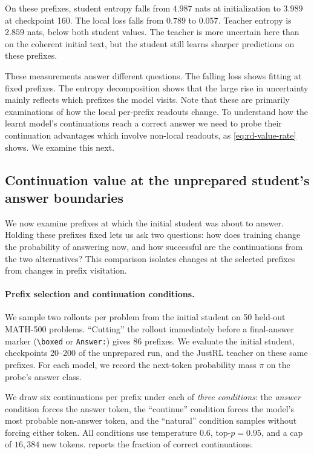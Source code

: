 On these prefixes, student entropy falls from $4.987$ nats at initialization to $3.989$ at checkpoint 160. The local loss falls from $0.789$ to $0.057$. Teacher entropy is $2.859$ nats, below both student values. The teacher is more uncertain here than on the coherent initial text, but the student still learns sharper predictions on these prefixes.

These measurements answer different questions. The falling loss shows fitting at fixed prefixes. The entropy decomposition shows that the large rise in uncertainty mainly reflects which prefixes the model visits. Note that these are primarily examinations of how the local per-prefix readouts change. To understand how the learnt model's continuations reach a correct answer we need to probe their continuation advantages which involve non-local readouts, as \cref{eq:rd-value-rate} shows. We examine this next.

\FloatBarrier
{}
\subsection{Continuation value at the unprepared student's answer boundaries}
\label{app:steer-probe}
We now examine prefixes at which the initial student was about to answer. Holding these prefixes fixed lets us ask two questions: how does training change the probability of answering now, and how successful are the continuations from the two alternatives? This comparison isolates changes at the selected prefixes from changes in prefix visitation.

\paragraph{Prefix selection and continuation conditions.}
We sample two rollouts per problem from the initial student on 50 held-out MATH-500 problems. ``Cutting'' the rollout immediately before a final-answer marker (\texttt{\textbackslash boxed} or \texttt{Answer:}) gives 86 prefixes. We evaluate the initial student, checkpoints 20--200 of the unprepared run, and the JustRL teacher on these same prefixes. For each model, we record the next-token probability mass $\pi$ on the probe's answer class.

We draw six continuations per prefix under each of \emph{three conditions}: the \emph{answer} condition forces the answer token, the ``continue'' condition forces the model's most probable non-answer token, and the ``natural'' condition samples without forcing either token. All conditions use temperature $0.6$, \mbox{top-$p=0.95$}, and a cap of $16{,}384$ new tokens.  reports the fraction of correct continuations.

